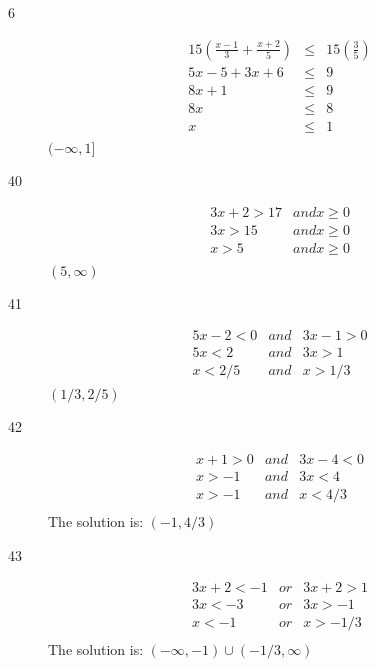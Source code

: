 \documentclass[letterpaper]{exam}
\begin{document}
\begin{description}
      \item[6]
        \begin{align*}
          15(\frac{x-1}{3} + \frac{x+2}{5}) & \leq & 15(\frac{3}{5}) \\
          5x - 5 + 3x + 6                   & \leq & 9 \\
          8x + 1                            & \leq & 9 \\
          8x                                & \leq & 8 \\
          x                                 & \leq & 1 \\
        \end{align*}
        $ \boxed{ (-\infty, 1] } $

      \item[40]
        \begin{align*}
          3x + 2 > 17 & and x \geq 0 \\
          3x > 15     & and x \geq 0 \\
          x > 5       & and x \geq 0 \\
        \end{align*}
      $ \boxed{ (5, \infty) } $

      \item[41]
        \begin{align*}
          5x - 2 < 0 &and& 3x - 1 > 0 \\
          5x < 2 &and& 3x > 1 \\
          x < 2/5 &and& x > 1/3 \\
        \end{align*}
        $\boxed{ (1/3, 2/5) }$

      \item[42]
      \begin{align*}
        x + 1 > 0 &and& 3x - 4 < 0 \\
        x > -1 &and& 3x < 4 \\
        x > -1 &and& x < 4/3 \\
      \end{align*}
      The solution is: \( (-1, 4/3) \)

      \item[43]
      \begin{align*}
        3x + 2 < -1 &or& 3x + 2 > 1 \\
        3x < -3 &or& 3x > -1 \\
        x < -1 &or& x > -1/3 \\
      \end{align*}
      The solution is: \( (-\infty, -1) \cup (-1/3, \infty) \)


\end{description}
\end{document}
